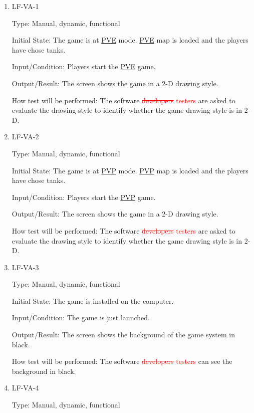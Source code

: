 \documentclass[12pt, titlepage]{article}
\begin{document}
\begin{enumerate}

\item{LF-VA-1\\}

Type: Manual, dynamic, functional
					
Initial State: The game is at \underline{PVE} mode. \underline{PVE} map is loaded and the players have chose tanks. 
					
Input/Condition: Players start the \underline{PVE} game. 
					
Output/Result: The screen shows the game in a 2-D drawing style.
					
How test will be performed: The software \textcolor{red}{\sout{developers} testers} are asked to evaluate the drawing style to identify whether the game drawing style is in 2-D.
					
\item{LF-VA-2\\}

Type: Manual, dynamic, functional
					
Initial State: The game is at \underline{PVP} mode. \underline{PVP} map is loaded and the players have chose tanks. 
					
Input/Condition: Players start the \underline{PVP} game. 
					
Output/Result: The screen shows the game in a 2-D drawing style.
					
How test will be performed: The software \textcolor{red}{\sout{developers} testers} are asked to evaluate the drawing style to identify whether the game drawing style is in 2-D. 

\item{LF-VA-3\\}

Type: Manual, dynamic, functional
					
Initial State: The game is installed on the computer.
					
Input/Condition: The game is just launched.
					
Output/Result: The screen shows the background of the game system in black.
					
How test will be performed: The software \textcolor{red}{\sout{developers} testers} can see the background in black. 

\item{LF-VA-4\\}

Type: Manual, dynamic, functional
					

\end{enumerate}
\end{document}

